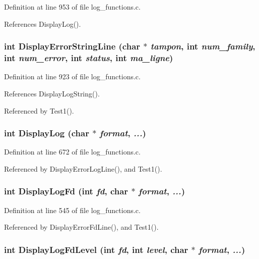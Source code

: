 Definition at line 953 of file log\_\-functions.c.

References Display\-Log().
\subsubsection{\setlength{\rightskip}{0pt plus 5cm}int Display\-Error\-String\-Line (char $\ast$ {\em tampon}, int {\em num\_\-family}, int {\em num\_\-error}, int {\em status}, int {\em ma\_\-ligne})}\label{log__functions_8c_a86}




Definition at line 923 of file log\_\-functions.c.

References Display\-Log\-String().

Referenced by Test1().
\subsubsection{\setlength{\rightskip}{0pt plus 5cm}int Display\-Log (char $\ast$ {\em format},  {\em ...})}\label{log__functions_8c_a74}




Definition at line 672 of file log\_\-functions.c.

Referenced by Display\-Error\-Log\-Line(), and Test1().
\subsubsection{\setlength{\rightskip}{0pt plus 5cm}int Display\-Log\-Fd (int {\em fd}, char $\ast$ {\em format},  {\em ...})}\label{log__functions_8c_a68}




Definition at line 545 of file log\_\-functions.c.

Referenced by Display\-Error\-Fd\-Line(), and Test1().
\subsubsection{\setlength{\rightskip}{0pt plus 5cm}int Display\-Log\-Fd\-Level (int {\em fd}, int {\em level}, char $\ast$ {\em format},  {\em ...})}\label{log__functions_8c_a77}




